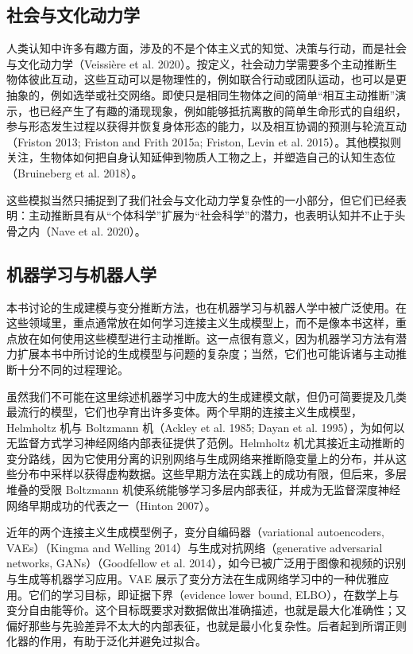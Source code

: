 \subsection{社会与文化动力学}

人类认知中许多有趣方面，涉及的不是个体主义式的知觉、决策与行动，而是社会与文化动力学（Veissière et al. 2020）。按定义，社会动力学需要多个主动推断生物体彼此互动，这些互动可以是物理性的，例如联合行动或团队运动，也可以是更抽象的，例如选举或社交网络。即使只是相同生物体之间的简单“相互主动推断”演示，也已经产生了有趣的涌现现象，例如能够抵抗离散的简单生命形式的自组织，参与形态发生过程以获得并恢复身体形态的能力，以及相互协调的预测与轮流互动（Friston 2013; Friston and Frith 2015a; Friston, Levin et al. 2015）。其他模拟则关注，生物体如何把自身认知延伸到物质人工物之上，并塑造自己的认知生态位（Bruineberg et al. 2018）。

这些模拟当然只捕捉到了我们社会与文化动力学复杂性的一小部分，但它们已经表明：主动推断具有从“个体科学”扩展为“社会科学”的潜力，也表明认知并不止于头骨之内（Nave et al. 2020）。

\subsection{机器学习与机器人学}

本书讨论的生成建模与变分推断方法，也在机器学习与机器人学中被广泛使用。在这些领域里，重点通常放在如何学习连接主义生成模型上，而不是像本书这样，重点放在如何使用这些模型进行主动推断。这一点很有意义，因为机器学习方法有潜力扩展本书中所讨论的生成模型与问题的复杂度；当然，它们也可能诉诸与主动推断十分不同的过程理论。

虽然我们不可能在这里综述机器学习中庞大的生成建模文献，但仍可简要提及几类最流行的模型，它们也孕育出许多变体。两个早期的连接主义生成模型，Helmholtz 机与 Boltzmann 机（Ackley et al. 1985; Dayan et al. 1995），为如何以无监督方式学习神经网络内部表征提供了范例。Helmholtz 机尤其接近主动推断的变分路线，因为它使用分离的识别网络与生成网络来推断隐变量上的分布，并从这些分布中采样以获得虚构数据。这些早期方法在实践上的成功有限，但后来，多层堆叠的受限 Boltzmann 机使系统能够学习多层内部表征，并成为无监督深度神经网络早期成功的代表之一（Hinton 2007）。

近年的两个连接主义生成模型例子，变分自编码器（variational autoencoders, VAEs）（Kingma and Welling 2014）与生成对抗网络（generative adversarial networks, GANs）（Goodfellow et al. 2014），如今已被广泛用于图像和视频的识别与生成等机器学习应用。VAE 展示了变分方法在生成网络学习中的一种优雅应用。它们的学习目标，即证据下界（evidence lower bound, ELBO），在数学上与变分自由能等价。这个目标既要求对数据做出准确描述，也就是最大化准确性；又偏好那些与先验差异不太大的内部表征，也就是最小化复杂性。后者起到所谓正则化器的作用，有助于泛化并避免过拟合。

